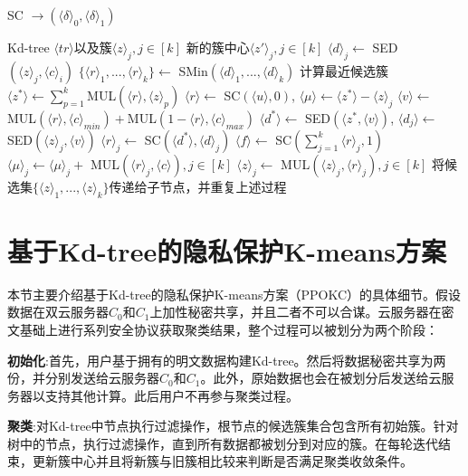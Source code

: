\begin{algorithm}[htbp]
	\renewcommand{\algorithmicrequire}{\textbf{输入:}}
	\renewcommand{\algorithmicensure}{\textbf{输出:}}
	\caption{SC $\rightarrow (\langle \delta \rangle_0, \langle \delta \rangle_1)$}
	\label{alg_sf}
	\begin{algorithmic}[1]
		\REQUIRE Kd-tree $\langle tr \rangle$以及簇$\langle z \rangle_j, j\in[k]$
		\ENSURE 新的簇中心$\langle z'\rangle_j,j\in[k]$
		\STATE $\langle d \rangle_j \leftarrow$ SED$(\langle z \rangle_j, \langle c \rangle_i)$ %
		\ENDFOR
		\STATE $\{\langle r\rangle_1,...,\langle r\rangle_k\} \leftarrow$ SMin$(\langle d \rangle_1,...,\langle d \rangle_k)$
		\STATE 计算最近候选簇$\langle z^* \rangle \leftarrow \sum_{p=1}^k$MUL$(\langle r \rangle,\langle z\rangle_p)$ %
		\STATE $\langle r \rangle \leftarrow$ SC$(\langle u \rangle, 0)$, $\langle \mu \rangle \leftarrow \langle z^{*} \rangle - \langle z\rangle_j$%
		\STATE $\langle v \rangle \leftarrow$ MUL$(\langle r\rangle, \langle c \rangle_{min})+ $MUL$(1-\langle r\rangle,\langle c\rangle_{max})$
		\STATE $\langle d^{*}\rangle \leftarrow$ SED$(\langle z^{*}, \langle v \rangle)$, $\langle d_j \rangle \leftarrow$ SED$(\langle z\rangle_j,\langle v\rangle)$ %
		\STATE $\langle r\rangle_j \leftarrow$ SC$(\langle d^{*}\rangle, \langle d\rangle_j)$
		\ENDFOR
		\STATE $\langle f \rangle \leftarrow$ SC$(\sum_{j=1}^{k}\langle r\rangle_j, 1)$
		\STATE $\langle \mu \rangle_j \leftarrow \langle \mu \rangle_j +$ MUL$(\langle r\rangle_j, \langle c \rangle),j\in[k]$ %
		\ELSE
		\STATE $\langle z \rangle_j \leftarrow$ MUL$(\langle z \rangle_j, \langle r\rangle_j), j\in[k]$
		\STATE 将候选集$\{\langle z \rangle_1,...,\langle z\rangle_k\}$传递给子节点，并重复上述过程
		\ENDIF
		\ENDFOR

	\end{algorithmic}
\end{algorithm}

\section{基于Kd-tree的隐私保护K-means方案}
\label{s3-ppokc}
本节主要介绍基于Kd-tree的隐私保护K-means方案（PPOKC）的具体细节。假设数据在双云服务器$C_0$和$C_1$上加性秘密共享，并且二者不可以合谋。云服务器在密文基础上进行系列安全协议获取聚类结果，整个过程可以被划分为两个阶段：
\begin{compactitem}
	\item \textbf{初始化}:首先，用户基于拥有的明文数据构建Kd-tree。然后将数据秘密共享为两份，并分别发送给云服务器$C_0$和$C_1$。此外，原始数据也会在被划分后发送给云服务器以支持其他计算。此后用户不再参与聚类过程。
	\item \textbf{聚类}:对Kd-tree中节点执行过滤操作，根节点的候选簇集合包含所有初始簇。针对树中的节点，执行过滤操作，直到所有数据都被划分到对应的簇。在每轮迭代结束，更新簇中心并且将新簇与旧簇相比较来判断是否满足聚类收敛条件。
\end{compactitem}

